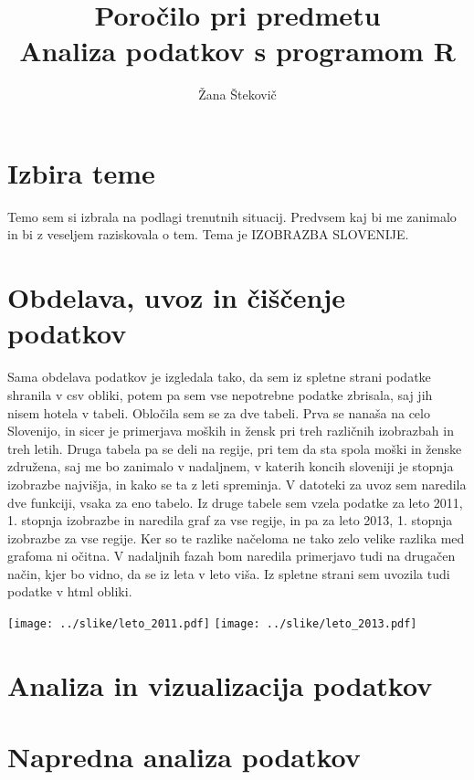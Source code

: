 \documentclass[11pt,a4paper]{article}
\begin{document}
\title{Poročilo pri predmetu \\
Analiza podatkov s programom R}
\author{Žana Štekovič}
\maketitle

\section{Izbira teme}
Temo sem si izbrala na podlagi trenutnih situacij. Predvsem kaj bi me zanimalo in bi z veseljem raziskovala o tem.
Tema je IZOBRAZBA SLOVENIJE.

\section{Obdelava, uvoz in čiščenje podatkov}
Sama obdelava podatkov je izgledala tako, da sem iz spletne strani podatke shranila v csv obliki, potem pa sem vse nepotrebne podatke zbrisala, saj jih nisem hotela v tabeli. Obločila sem se za dve tabeli. Prva se nanaša na celo Slovenijo, in sicer je primerjava moških in žensk pri treh različnih izobrazbah in treh letih. Druga tabela pa se deli na regije, pri tem da sta spola moški in ženske združena, saj me bo zanimalo v nadaljnem, v katerih koncih sloveniji je stopnja izobrazbe najvišja, in kako se ta z leti spreminja.
V datoteki za uvoz sem naredila dve funkciji, vsaka za eno tabelo. Iz druge tabele sem vzela podatke za leto 2011, 1. stopnja izobrazbe in naredila graf za vse regije, in pa za leto 2013, 1. stopnja izobrazbe za vse regije. Ker so te razlike načeloma ne tako zelo velike razlika med grafoma ni očitna. V nadaljnih fazah bom naredila primerjavo tudi na drugačen način, kjer bo vidno, da se iz leta v leto viša.  Iz spletne strani sem uvozila tudi podatke v html obliki.

\texttt{[image: ../slike/leto\_2011.pdf]}
\texttt{[image: ../slike/leto\_2013.pdf]}

\section{Analiza in vizualizacija podatkov}


\section{Napredna analiza podatkov}

\end{document}

